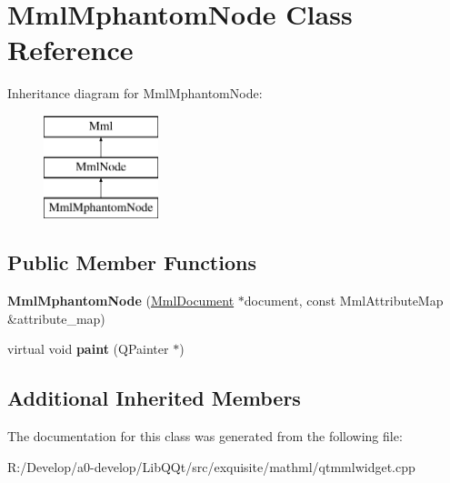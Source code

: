 \hypertarget{class_mml_mphantom_node}{}\section{Mml\+Mphantom\+Node Class Reference}
\label{class_mml_mphantom_node}
Inheritance diagram for Mml\+Mphantom\+Node\+:\begin{figure}[H]
\begin{center}
\leavevmode
\includegraphics[height=3.000000cm]{class_mml_mphantom_node}
\end{center}
\end{figure}
\subsection*{Public Member Functions}
\begin{DoxyCompactItemize}
\item 
\mbox{\label{class_mml_mphantom_node_ab8afe5f4ea510afa43adeca3cc8e3b13}} 
{\bfseries Mml\+Mphantom\+Node} (\mbox{\hyperlink{class_mml_document}{Mml\+Document}} $\ast$document, const Mml\+Attribute\+Map \&attribute\+\_\+map)
\item 
\mbox{\label{class_mml_mphantom_node_a410a2de2b4b242647b370d0a7f5e57e6}} 
virtual void {\bfseries paint} (Q\+Painter $\ast$)
\end{DoxyCompactItemize}
\subsection*{Additional Inherited Members}


The documentation for this class was generated from the following file\+:\begin{DoxyCompactItemize}
\item 
R\+:/\+Develop/a0-\/develop/\+Lib\+Q\+Qt/src/exquisite/mathml/qtmmlwidget.\+cpp\end{DoxyCompactItemize}
